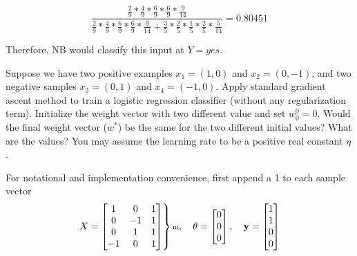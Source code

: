 \documentclass[11pt,largemargins]{homework}
\begin{document}
\begin{alphaparts}
	$$\frac{\frac{2}{9}*\frac{4}{9}*\frac{6}{9}*\frac{6}{9}*\frac{9}{14}}{\frac{2}{9}*\frac{4}{9}*\frac{6}{9}*\frac{6}{9}*\frac{9}{14} + \frac{3}{5}*\frac{2}{5}*\frac{1}{5}*\frac{2}{5}*\frac{5}{14}}=0.80451$$

	Therefore, NB would classify this input at $Y=yes$.
\end{alphaparts}
\question Suppose we have two positive examples $x_1=(1, 0)$ and $x_2=(0, -1)$, and two negative samples $x_3=(0,1)$ and $x_4=(-1, 0).$ Apply standard gradient ascent method to train a logistic regression classifier (without any regularization term). Initialize the weight vector with two different value and set $w_0^0=0$. Would the final weight vector ($w^*$) be the same for the two different initial values? What are the values? You may assume the learning rate to be a positive real constant $\eta$.

For notational and implementation convenience, first append a 1 to each sample vector
\def\pfourmatrix{\begin{bmatrix}
	1 & 0 & 1\\
	0 & -1 & 1\\
	0 & 1 & 1\\
	-1 & 0 & 1
\end{bmatrix}}
$$\left.X=\pfourmatrix\right\}\text{\scriptsize m},\quad\mathbf{\theta}=
\begin{bmatrix}
	0\\
	0\\
	0
\end{bmatrix},\quad\mathbf{y}=
\begin{bmatrix}
	1\\
	1\\
	0\\
	0
\end{bmatrix}$$
\end{document}
